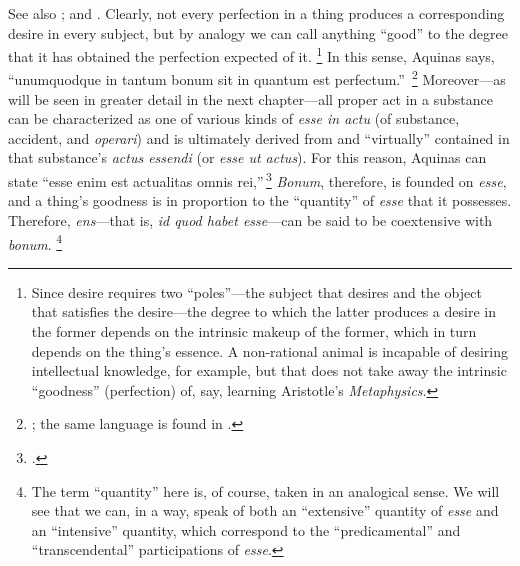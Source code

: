 {{See also \cite[65]{aertsen:good_as_transcendental}; and \cite[190]{definance:etre-et-agir}.}
%
 Clearly, not every perfection in a thing produces a corresponding desire in every subject, but by analogy we can call anything ``good'' to the degree that it has obtained the perfection expected of it.%
%
\footnote{Since desire requires two ``poles''---the subject that desires and the object that satisfies the desire---the degree to which the latter produces a desire in the former depends on the intrinsic makeup of the former, which in turn depends on the thing's essence. A non-rational animal is incapable of desiring intellectual knowledge, for example, but that does not take away the intrinsic ``goodness'' (perfection) of, say, learning Aristotle's \emph{Metaphysics}.} In this sense, Aquinas says, ``unumquodque in tantum bonum sit in quantum est perfectum.''\,%
%
\footnote{\Cite[III, cap.~24, n.~6 (Marietti n.~2051)]{st:contragent}; the same language is found in \cite[III, cap.~20, n.~2 (Marietti n.~2010)]{st:contragent}.}
%
Moreover---as will be seen in greater detail in the next chapter---all proper act in a substance can be characterized as one of various kinds of \emph{esse in actu} (of substance, accident, and \emph{operari}) and is ultimately derived from and ``virtually'' contained in that substance's \emph{actus essendi} (or \emph{esse ut actus}). For this reason, Aquinas can state ``esse enim est actualitas omnis rei,''\,\footcite[I, q.~5, a.~1, co.]{st:summa} \emph{Bonum}, therefore, is founded on \emph{esse}, and a thing's goodness is in proportion to the ``quantity'' of \emph{esse} that it possesses.
Therefore, \emph{ens}---that is, \emph{id quod habet esse}---can be said to be coextensive with \emph{bonum}.%
%
\footnote{The term ``quantity'' here is, of course, taken in an analogical sense. We will see that we can, in a way, speak of both an ``extensive'' quantity of \emph{esse} and an ``intensive'' quantity, which correspond to the ``predicamental'' and ``transcendental'' participations of \emph{esse}.}
%

}
